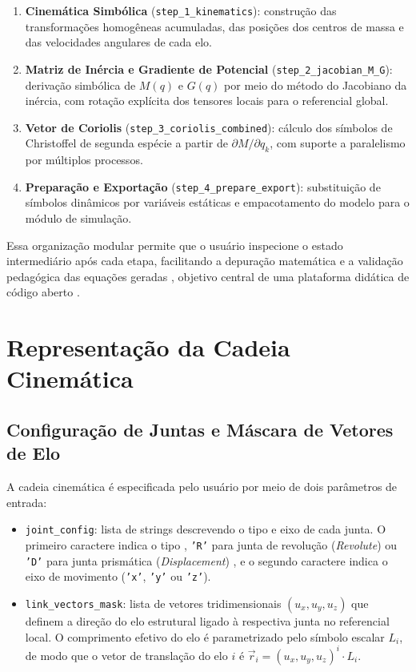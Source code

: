 \begin{enumerate}
    \item \textbf{Cinemática Simbólica} (\texttt{step\_1\_kinematics}): construção das transformações homogêneas acumuladas, das posições dos centros de massa e das velocidades angulares de cada elo.
    \item \textbf{Matriz de Inércia e Gradiente de Potencial} (\texttt{step\_2\_jacobian\_M\_G}): derivação simbólica de $M(q)$ e $G(q)$ por meio do método do Jacobiano da inércia, com rotação explícita dos tensores locais para o referencial global.
    \item \textbf{Vetor de Coriolis} (\texttt{step\_3\_coriolis\_combined}): cálculo dos símbolos de Christoffel de segunda espécie a partir de $\partial M/\partial q_k$, com suporte a paralelismo por múltiplos processos.
    \item \textbf{Preparação e Exportação} (\texttt{step\_4\_prepare\_export}): substituição de símbolos dinâmicos por variáveis estáticas e empacotamento do modelo para o módulo de simulação.
\end{enumerate}

Essa organização modular permite que o usuário inspecione o estado intermediário após cada etapa, facilitando a depuração matemática e a validação pedagógica das equações geradas , objetivo central de uma plataforma didática de código aberto \cite{corke2021toolbox}.

\section{Representação da Cadeia Cinemática}

\subsection{Configuração de Juntas e Máscara de Vetores de Elo}

A cadeia cinemática é especificada pelo usuário por meio de dois parâmetros de entrada:

\begin{itemize}
    \item \texttt{joint\_config}: lista de strings descrevendo o tipo e eixo de cada junta. O primeiro caractere indica o tipo , \texttt{'R'} para junta de revolução (\textit{Revolute}) ou \texttt{'D'} para junta prismática (\textit{Displacement}) , e o segundo caractere indica o eixo de movimento (\texttt{'x'}, \texttt{'y'} ou \texttt{'z'}).
    \item \texttt{link\_vectors\_mask}: lista de vetores tridimensionais $(u_x, u_y, u_z)$ que definem a direção do elo estrutural ligado à respectiva junta no referencial local. O comprimento efetivo do elo é parametrizado pelo símbolo escalar $L_i$, de modo que o vetor de translação do elo $i$ é $\vec{r}_i = (u_x, u_y, u_z)^i \cdot L_i$.
\end{itemize}

